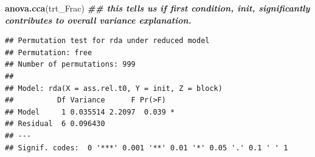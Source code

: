 \documentclass[
]{article}
\newenvironment{Shaded}{\begin{snugshade}}{\end{snugshade}}
\newcommand{\DocumentationTok}[1]{\textcolor[rgb]{0.56,0.35,0.01}{\textbf{\textit{#1}}}}
\newcommand{\FunctionTok}[1]{\textcolor[rgb]{0.13,0.29,0.53}{\textbf{#1}}}
\newcommand{\NormalTok}[1]{#1}
\begin{document}
\begin{Shaded}
\begin{Highlighting}[]
\FunctionTok{anova.cca}\NormalTok{(trt\_Frac) }\DocumentationTok{\#\# this tells us if first condition, init, significantly contributes to overall variance explanation. }
\end{Highlighting}
\end{Shaded}

\begin{verbatim}
## Permutation test for rda under reduced model
## Permutation: free
## Number of permutations: 999
## 
## Model: rda(X = ass.rel.t0, Y = init, Z = block)
##          Df Variance      F Pr(>F)  
## Model     1 0.035514 2.2097  0.039 *
## Residual  6 0.096430                
## ---
## Signif. codes:  0 '***' 0.001 '**' 0.01 '*' 0.05 '.' 0.1 ' ' 1
\end{verbatim}
\end{document}
